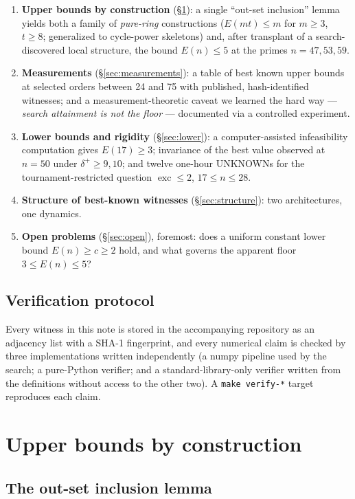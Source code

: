 \documentclass[11pt]{amsart}
\theoremstyle{remark}
\newcommand{\exc}{\operatorname{exc}}
\begin{document}
\begin{enumerate}
\item \textbf{Upper bounds by construction} (\S\ref{sec:constructions}): a
  single ``out-set inclusion'' lemma yields both a family of
  \emph{pure-ring} constructions ($E(mt) \le m$ for $m \ge 3$, $t \ge 8$;
  generalized to cycle-power skeletons) and, after transplant of a
  search-discovered local structure, the bound $E(n) \le 5$ at the primes
  $n = 47, 53, 59$.
\item \textbf{Measurements} (\S\ref{sec:measurements}): a table of best
  known upper bounds at selected orders between 24 and 75
  with published, hash-identified witnesses; and a measurement-theoretic
  caveat we learned the hard way --- \emph{search attainment is not the
  floor} --- documented via a controlled experiment.
\item \textbf{Lower bounds and rigidity} (\S\ref{sec:lower}): a
  computer-assisted infeasibility computation gives $E(17) \ge 3$;
  invariance of the best value observed at $n = 50$ under
  $\delta^+ \ge 9, 10$; and twelve one-hour UNKNOWNs for the
  tournament-restricted question $\exc \le 2$, $17 \le n \le 28$.
\item \textbf{Structure of best-known witnesses}
  (\S\ref{sec:structure}): two architectures, one dynamics.
\item \textbf{Open problems} (\S\ref{sec:open}), foremost: does a uniform
  constant lower bound $E(n) \ge c \ge 2$ hold, and what governs the
  apparent floor $3 \le E(n) \le 5$?
\end{enumerate}

\subsection*{Verification protocol}
Every witness in this note is stored in the accompanying repository as an
adjacency list with a SHA-1 fingerprint, and every numerical claim is checked
by three implementations written independently (a numpy pipeline used by the
search; a pure-Python verifier; and a standard-library-only verifier written
from the definitions without access to the other two). A
\texttt{make verify-*} target reproduces each claim.

\section{Upper bounds by construction}\label{sec:constructions}

\subsection{The out-set inclusion lemma}
\end{document}
